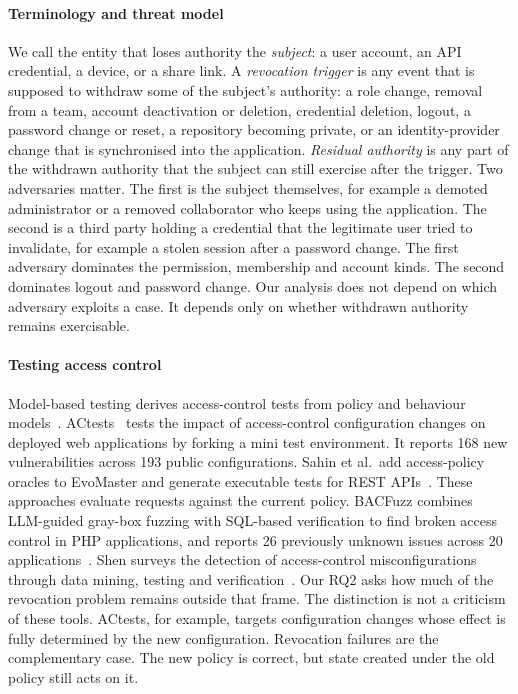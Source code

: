 \documentclass[preprint,12pt]{elsarticle}
\begin{document}
\paragraph{Terminology and threat model}
We call the entity that loses authority the \emph{subject}: a user account, an API credential, a device, or a
share link. A \emph{revocation trigger} is any event that is supposed to withdraw some of the subject's
authority: a role change, removal from a team, account deactivation or deletion, credential deletion, logout,
a password change or reset, a repository becoming private, or an identity-provider change that is synchronised into
the application. \emph{Residual authority} is any part of the withdrawn authority that the subject can still
exercise after the trigger. Two adversaries matter. The first is the subject themselves, for example a demoted
administrator or a removed collaborator who keeps using the application. The second is a third party holding a
credential that the legitimate user tried to invalidate, for example a stolen session after a password change.
The first adversary dominates the permission, membership and account kinds. The second dominates logout and
password change. Our analysis does not depend on which adversary exploits a case. It depends only on whether
withdrawn authority remains exercisable.

\paragraph{Testing access control}
Model-based testing derives access-control tests from policy and behaviour models~\cite{xu2015rbac}.
ACtests~\cite{xiang2025actests} tests the impact of access-control configuration changes on deployed web
applications by forking a mini test environment. It reports 168 new vulnerabilities across 193 public
configurations. Sahin et al.\ add access-policy oracles to EvoMaster and generate executable
tests for REST APIs~\cite{sahin2026evomaster}. These approaches evaluate requests against the current
policy. BACFuzz combines LLM-guided
gray-box fuzzing with SQL-based verification to find broken access control in PHP applications, and reports
26 previously unknown issues across 20 applications~\cite{dharmaadi2025bacfuzz}. Shen surveys the detection
of access-control misconfigurations through data mining, testing and verification~\cite{shen2023acmisconfig}. Our RQ2 asks how much of the revocation problem remains outside that frame. The distinction is not a
criticism of these tools. ACtests, for example, targets configuration changes whose effect is fully determined by the
new configuration. Revocation failures are the complementary case. The new policy is correct, but state created
under the old policy still acts on it.
\end{document}
